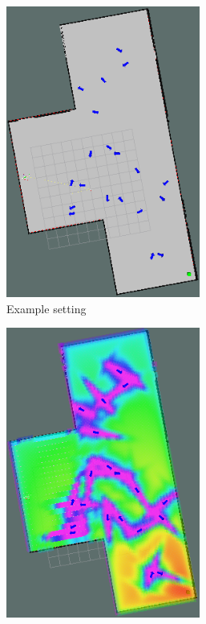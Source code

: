 \documentclass[a4paper,11pt]{report}
\begin{document}
	\begin{figure}[tbh]
  \centering
      \begin{subfigure}[b]{0.435\columnwidth}
	\hspace{5mm}
    \includegraphics[width=0.7\textwidth]{figures/people.png}
    \caption{Example setting }
    \label{fig:exp_setting}
  \end{subfigure}
  \hspace{10mm}
  \begin{subfigure}[b]{0.435\columnwidth}
  \hspace{4mm}
    \includegraphics[width=0.7\textwidth]{figures/cost_f.png}

\end{subfigure}
\end{figure}
\end{document}
